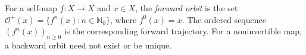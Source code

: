 
For a self-map $f:X\to X$ and $x\in X$, the \emph{forward orbit} is the set $\mathcal O^+(x)=\{f^n(x):n\in\mathbb N_0\}$, where $f^0(x)=x$. The ordered sequence $(f^n(x))_{n\ge0}$ is the corresponding forward trajectory. For a noninvertible map, a backward orbit need not exist or be unique.
